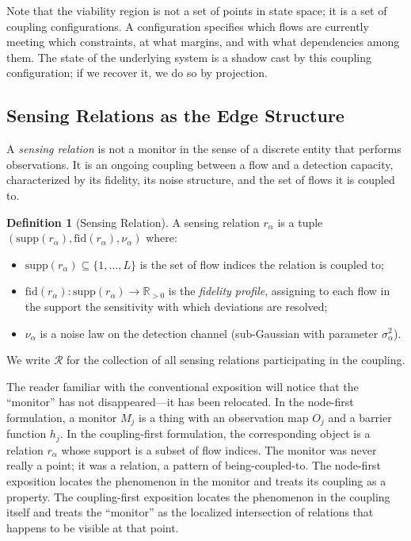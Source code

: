 \documentclass[11pt]{article}
\theoremstyle{definition}
\newtheorem{definition}[theorem]{Definition}
\theoremstyle{remark}
\begin{document}
Note that the viability region is not a set of points in state space; it is a set of coupling configurations. A configuration specifies which flows are currently meeting which constraints, at what margins, and with what dependencies among them. The state of the underlying system is a shadow cast by this coupling configuration; if we recover it, we do so by projection.

\subsection{Sensing Relations as the Edge Structure}

A \emph{sensing relation} is not a monitor in the sense of a discrete entity that performs observations. It is an ongoing coupling between a flow and a detection capacity, characterized by its fidelity, its noise structure, and the set of flows it is coupled to.

\begin{definition}[Sensing Relation]
A sensing relation $r_\alpha$ is a tuple $(\mathrm{supp}(r_\alpha), \mathrm{fid}(r_\alpha), \nu_\alpha)$ where:
\begin{itemize}
\item $\mathrm{supp}(r_\alpha) \subseteq \{1, \ldots, L\}$ is the set of flow indices the relation is coupled to;
\item $\mathrm{fid}(r_\alpha): \mathrm{supp}(r_\alpha) \to \mathbb{R}_{>0}$ is the \emph{fidelity profile}, assigning to each flow in the support the sensitivity with which deviations are resolved;
\item $\nu_\alpha$ is a noise law on the detection channel (sub-Gaussian with parameter $\sigma_\alpha^2$).
\end{itemize}
We write $\mathcal{R}$ for the collection of all sensing relations participating in the coupling.
\end{definition}

The reader familiar with the conventional exposition will notice that the ``monitor'' has not disappeared---it has been relocated. In the node-first formulation, a monitor $M_j$ is a thing with an observation map $O_j$ and a barrier function $h_j$. In the coupling-first formulation, the corresponding object is a relation $r_\alpha$ whose support is a subset of flow indices. The monitor was never really a point; it was a relation, a pattern of being-coupled-to. The node-first exposition locates the phenomenon in the monitor and treats its coupling as a property. The coupling-first exposition locates the phenomenon in the coupling itself and treats the ``monitor'' as the localized intersection of relations that happens to be visible at that point.
\end{document}
